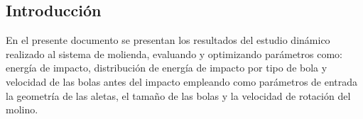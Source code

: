\begin{center}
	\section{Introducci\'on}
\end{center}

\noindent
\justify

En el presente documento se presentan los resultados del estudio din\'amico realizado al sistema de molienda, evaluando y optimizando par\'ametros como: energ\'ia de impacto, distribuci\'on de energ\'ia de impacto por tipo de bola y velocidad de las bolas antes del impacto empleando como par\'ametros de entrada la geometr\'ia de las aletas, el tama\~no de las bolas y la velocidad de rotaci\'on del molino.